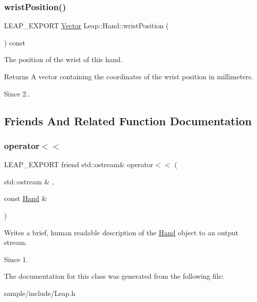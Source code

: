 \subsubsection{\texorpdfstring{wrist\+Position()}{wristPosition()}}
{\footnotesize\ttfamily L\+E\+A\+P\+\_\+\+E\+X\+P\+O\+RT \hyperlink{struct_leap_1_1_vector}{Vector} Leap\+::\+Hand\+::wrist\+Position (\begin{DoxyParamCaption}{ }\end{DoxyParamCaption}) const}

The position of the wrist of this hand.

\begin{DoxyReturn}{Returns}
A vector containing the coordinates of the wrist position in millimeters. 
\end{DoxyReturn}
\begin{DoxySince}{Since}
2.. 
\end{DoxySince}


\subsection{Friends And Related Function Documentation}
\mbox{\label{class_leap_1_1_hand_a0b79e476fe0b74207a5d574c4ae4fe3d}} 
\subsubsection{\texorpdfstring{operator$<$$<$}{operator<<}}
{\footnotesize\ttfamily L\+E\+A\+P\+\_\+\+E\+X\+P\+O\+RT friend std\+::ostream\& operator$<$$<$ (\begin{DoxyParamCaption}\item[{std\+::ostream \&}]{,  }\item[{const \hyperlink{class_leap_1_1_hand}{Hand} \&}]{ }\end{DoxyParamCaption})\hspace{0.3cm}{\ttfamily [friend]}}

Writes a brief, human readable description of the \hyperlink{class_leap_1_1_hand}{Hand} object to an output stream.


\begin{DoxyCodeInclude}
\end{DoxyCodeInclude}


\begin{DoxySince}{Since}
1. 
\end{DoxySince}


The documentation for this class was generated from the following file\+:\begin{DoxyCompactItemize}
\item 
sample/include/Leap.\+h\end{DoxyCompactItemize}
